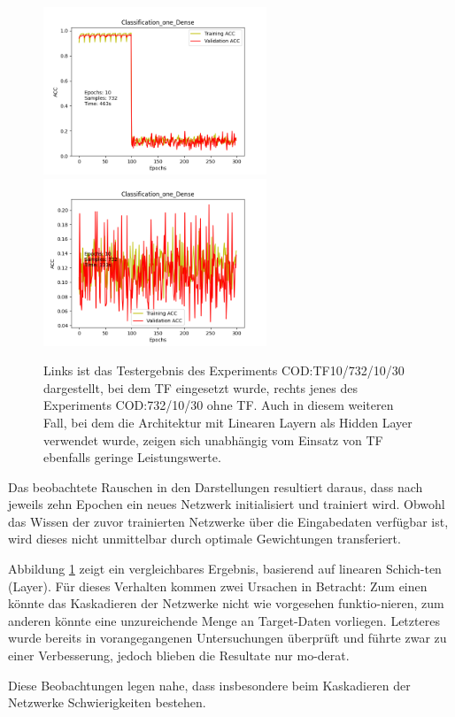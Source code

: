 \begin{figure}[htpb]
    \includegraphics[height=5cm]{../../Plots/ba_plots/classTF/cod_tr.png}
    \includegraphics[height=5cm]{../../Plots/ba_plots/classTF/wocod_tr.png}
    \caption{\label{fig:cod_tr} 
    \small{Links ist das Testergebnis des Experiments COD:TF10/732/10/30 dargestellt, bei dem TF eingesetzt wurde, rechts jenes des 
    Experiments COD:732/10/30 ohne TF. Auch in diesem weiteren Fall, bei dem die Architektur mit Linearen Layern als Hidden Layer verwendet 
    wurde, zeigen sich unabhängig vom Einsatz von TF ebenfalls geringe Leistungswerte.}}
\end{figure}

Das beobachtete Rauschen in den Darstellungen resultiert daraus, dass nach jeweils zehn Epochen ein neues Netzwerk initialisiert und trainiert 
wird. Obwohl das Wissen der zuvor trainierten Netzwerke über die Eingabedaten verfügbar ist, wird dieses nicht unmittelbar durch optimale 
Gewichtungen transferiert.

Abbildung \ref{fig:cod_tr} zeigt ein vergleichbares Ergebnis, basierend auf linearen Schich-ten (Layer). Für dieses Verhalten kommen zwei Ursachen in 
Betracht: Zum einen könnte das Kaskadieren der Netzwerke nicht wie vorgesehen funktio-nieren, zum anderen könnte eine unzureichende Menge an 
Target-Daten vorliegen. Letzteres wurde bereits in vorangegangenen Untersuchungen überprüft und führte zwar zu einer Verbesserung, jedoch 
blieben die Resultate nur mo-derat.

Diese Beobachtungen legen nahe, dass insbesondere beim Kaskadieren der Netzwerke Schwierigkeiten bestehen.
